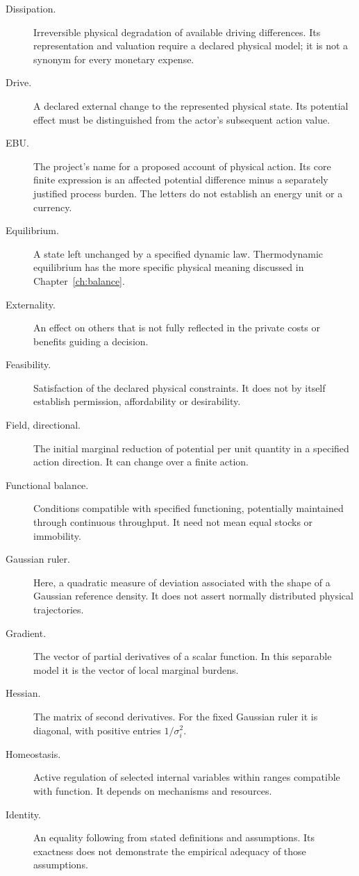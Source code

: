 \begin{description}
\item[Dissipation.] Irreversible physical degradation of available driving differences. Its representation and valuation require a declared physical model; it is not a synonym for every monetary expense.
\item[Drive.] A declared external change to the represented physical state. Its potential effect must be distinguished from the actor's subsequent action value.
\item[EBU.] The project's name for a proposed account of physical action. Its core finite expression is an affected potential difference minus a separately justified process burden. The letters do not establish an energy unit or a currency.
\item[Equilibrium.] A state left unchanged by a specified dynamic law. Thermodynamic equilibrium has the more specific physical meaning discussed in Chapter~\ref{ch:balance}.
\item[Externality.] An effect on others that is not fully reflected in the private costs or benefits guiding a decision.
\item[Feasibility.] Satisfaction of the declared physical constraints. It does not by itself establish permission, affordability or desirability.
\item[Field, directional.] The initial marginal reduction of potential per unit quantity in a specified action direction. It can change over a finite action.
\item[Functional balance.] Conditions compatible with specified functioning, potentially maintained through continuous throughput. It need not mean equal stocks or immobility.
\item[Gaussian ruler.] Here, a quadratic measure of deviation associated with the shape of a Gaussian reference density. It does not assert normally distributed physical trajectories.
\item[Gradient.] The vector of partial derivatives of a scalar function. In this separable model it is the vector of local marginal burdens.
\item[Hessian.] The matrix of second derivatives. For the fixed Gaussian ruler it is diagonal, with positive entries $1/\sigma_i^2$.
\item[Homeostasis.] Active regulation of selected internal variables within ranges compatible with function. It depends on mechanisms and resources.
\item[Identity.] An equality following from stated definitions and assumptions. Its exactness does not demonstrate the empirical adequacy of those assumptions.

\end{description}
